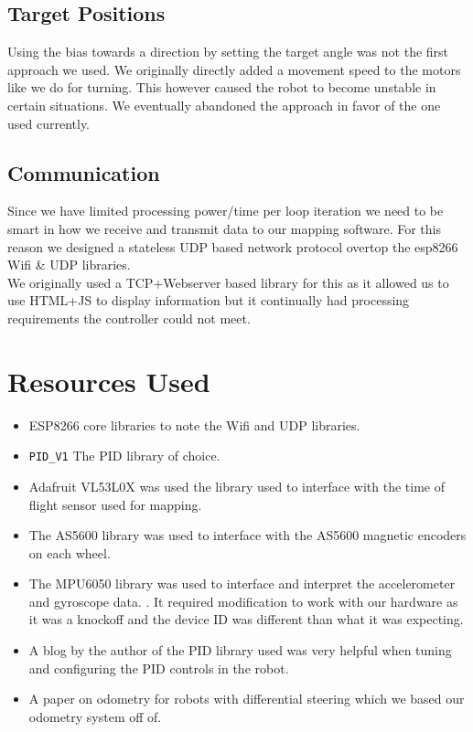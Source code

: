 \documentclass[12pt]{article}
\begin{document}
\subsection{Target Positions}
Using the bias towards a direction by setting the target angle was not the first approach we used. We originally directly added a movement speed to the motors like we do for turning. This however caused the robot to become unstable in certain situations. We eventually abandoned the approach in favor of the one used currently.

\subsection{Communication}
Since we have limited processing power/time per loop iteration we need to be smart in how we receive and transmit data to our mapping software. For this reason we designed a stateless UDP based network protocol overtop the esp8266 Wifi \& UDP libraries. \cite{wifi_lib}\\

We originally used a TCP+Webserver based library for this as it allowed us to use HTML+JS to display information but it continually had processing requirements the controller could not meet.

\section{Resources Used}
\begin{itemize}
	\item ESP8266 core libraries to note the Wifi and UDP libraries. \cite{wifi_lib}
	\item \texttt{PID\_V1} The PID library of choice. \cite{pid_lib}
	\item Adafruit VL53L0X was used the library used to interface with the time of flight sensor used for mapping. \cite{dist_lib}
	\item The AS5600 library was used to interface with the AS5600 magnetic encoders on each wheel. \cite{enc_lib}
	\item The MPU6050 library was used to interface and interpret the accelerometer and gyroscope data. \cite{gyro_lib}. It required modification to work with our hardware as it was a knockoff and the device ID was different than what it was expecting.
	\item A blog by the author of the PID library used was very helpful when tuning and configuring the PID controls in the robot. \cite{pid_help}
	\item A paper on odometry for robots with differential steering which we based our odometry system off of. \cite{odom_help}
\end{itemize}


\nocite{*}


\end{document}
